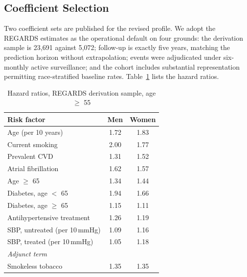 \documentclass[conference]{IEEEtran}
\begin{document}
\subsection{Coefficient Selection}
Two coefficient sets are published for the revised profile. We adopt the REGARDS
estimates as the operational default on four grounds: the derivation sample is
23{,}691 against 5{,}072; follow-up is exactly five years, matching the prediction
horizon without extrapolation; events were adjudicated under six-monthly active
surveillance; and the cohort includes substantial representation permitting
race-stratified baseline rates. Table~\ref{tab:coef} lists the hazard ratios.

\begin{table}[t]
\caption{Hazard ratios, REGARDS derivation sample, age $\geq$ 55}
\label{tab:coef}
\centering
\footnotesize
\begin{tabular}{lcc}
\toprule
Risk factor & Men & Women \\
\midrule
Age (per 10 years)          & 1.72 & 1.83 \\
Current smoking             & 2.00 & 1.77 \\
Prevalent CVD               & 1.31 & 1.52 \\
Atrial fibrillation         & 1.62 & 1.57 \\
Age $\geq$ 65               & 1.34 & 1.44 \\
Diabetes, age $<$ 65        & 1.94 & 1.66 \\
Diabetes, age $\geq$ 65     & 1.15 & 1.11 \\
Antihypertensive treatment  & 1.26 & 1.19 \\
SBP, untreated (per 10\,mmHg) & 1.09 & 1.16 \\
SBP, treated (per 10\,mmHg)   & 1.05 & 1.18 \\
\midrule
\textit{Adjunct term} & \multicolumn{2}{c}{} \\
Smokeless tobacco           & 1.35 & 1.35 \\
\bottomrule
\end{tabular}
\end{table}
\end{document}
